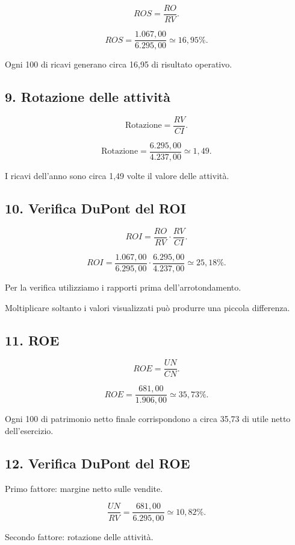 \[
ROS=\frac{RO}{RV}.
\]

\[
ROS=
\frac{1.067{,}00}{6.295{,}00}
\simeq
\boxed{16{,}95\%}.
\]

\noindent Ogni 100 di ricavi
generano circa 16,95
di risultato operativo.


\subsection*{9. Rotazione delle attività}

\[
\text{Rotazione}
=
\frac{RV}{CI}.
\]

\[
\text{Rotazione}
=
\frac{6.295{,}00}{4.237{,}00}
\simeq
\boxed{1{,}49}.
\]

\noindent I ricavi dell'anno
sono circa 1,49 volte
il valore delle attività.


\subsection*{10. Verifica DuPont del ROI}

\[
ROI=
\frac{RO}{RV}
\cdot
\frac{RV}{CI}.
\]

\[
ROI=
\frac{1.067{,}00}{6.295{,}00}
\cdot
\frac{6.295{,}00}{4.237{,}00}
\simeq
\boxed{25{,}18\%}.
\]

\noindent Per la verifica
utilizziamo i rapporti
prima dell'arrotondamento.

\noindent Moltiplicare soltanto
i valori visualizzati
può produrre una piccola differenza.


\subsection*{11. ROE}

\[
ROE=\frac{UN}{CN}.
\]

\[
ROE=
\frac{681{,}00}{1.906{,}00}
\simeq
\boxed{35{,}73\%}.
\]

\noindent Ogni 100 di patrimonio netto finale
corrispondono a circa 35,73
di utile netto dell'esercizio.


\subsection*{12. Verifica DuPont del ROE}

\noindent Primo fattore:
margine netto sulle vendite.

\[
\frac{UN}{RV}
=
\frac{681{,}00}{6.295{,}00}
\simeq
\boxed{10{,}82\%}.
\]

\noindent Secondo fattore:
rotazione delle attività.

